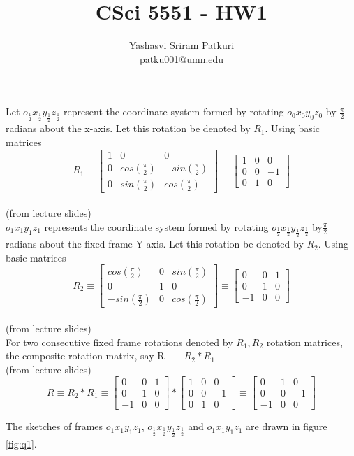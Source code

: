 \documentclass[12pt]{article}
\title{CSci 5551 - HW1}
\author{Yashasvi Sriram Patkuri\\patku001@umn.edu}
\newcommand{\f}[1]{o_{#1}x_{#1}y_{#1}z_{#1}}
\newcommand{\fromslides}{{\\ \color{blue} \hspace*{\fill}(from lecture slides)} \\}
\newcommand{\rx}[1]{\begin{bmatrix} 1 & 0 & 0 \\ 0 & cos(#1) & -sin(#1) \\ 0 & sin(#1) & cos(#1) \end{bmatrix}}
\newcommand{\ry}[1]{\begin{bmatrix} cos(#1) & 0 & sin(#1) \\ 0 & 1 & 0 \\ -sin(#1) & 0 & cos(#1) \end{bmatrix}}
\begin{document}
\maketitle
\pagebreak

\section{}
Let $ \f{\frac{1}{2}} $ represent the coordinate system formed by rotating $ \f{0} $ by $ \frac{\pi}{2} $ radians about the x-axis.
Let this rotation be denoted by $ R_1 $. Using basic matrices \[ R_1 \equiv \rx{\frac{\pi}{2}} \equiv \begin{bmatrix} 1 & 0 & 0 \\ 0 & 0 & -1 \\ 0 & 1 & 0 \end{bmatrix} \]\fromslides

$ \f{1} $ represents the coordinate system formed by rotating $ \f{\frac{1}{2}} $ by$ \frac{\pi}{2} $ radians about the fixed frame Y-axis.
Let this rotation be denoted by $ R_2 $. Using basic matrices \[ R_2 \equiv \ry{\frac{\pi}{2}} \equiv \begin{bmatrix} 0 & 0 & 1 \\ 0 & 1 & 0 \\ -1 & 0 & 0 \end{bmatrix} \]\fromslides

For two consecutive fixed frame rotations denoted by $ R_1, R_2 $ rotation matrices, the composite rotation matrix, say R $ \equiv $ $ R_2 * R_1 $\fromslides

\[
R
\equiv R_2 * R_1
\equiv \begin{bmatrix} 0 & 0 & 1 \\ 0 & 1 & 0 \\ -1 & 0 & 0 \end{bmatrix} * \begin{bmatrix} 1 & 0 & 0 \\ 0 & 0 & -1 \\ 0 & 1 & 0 \end{bmatrix}
\equiv \begin{bmatrix} 0 & 1 & 0 \\ 0 & 0 & -1 \\ -1 & 0 & 0 \end{bmatrix}
\]

The sketches of frames $ \f{1} $, $ \f{\frac{1}{2}} $ and $ \f{1} $ are drawn in figure \ref{fig:q1}.
\end{document}
